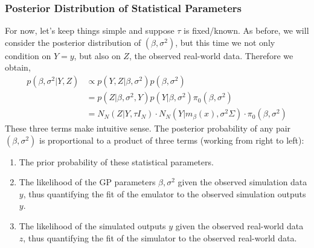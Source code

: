 \documentclass[12pt]{article}
\begin{document}
\subsubsection{Posterior Distribution of Statistical Parameters}
For now, let's keep things simple and suppose $\tau$ is fixed/known. As before, we will 
consider the posterior distribution of $(\beta, \sigma^2)$, but this time we not only condition on $Y = y$, but also on $Z$, the observed real-world data. Therefore we obtain, 
\begin{align*}
p(\beta, \sigma^2|Y, Z) &\propto p(Y, Z|\beta, \sigma^2)p(\beta, \sigma^2) \\
				   &= p(Z|\beta, \sigma^2, Y)p(Y|\beta, \sigma^2)\pi_0(\beta, \sigma^2) \\
				   &= N_N(Z|Y, \tau I_N) \cdot N_N(Y|m_\beta(x), \sigma^2 \Sigma) \cdot \pi_0(\beta, \sigma^2)
\end{align*}
These three terms make intuitive sense. The posterior probability of any pair $(\beta, \sigma^2)$ is proportional to a product of three terms (working from right to left):
\begin{enumerate}
\item The prior probability of these statistical parameters. 
\item The likelihood of the GP parameters $\beta, \sigma^2$ given the observed simulation data $y$, thus quantifying the fit of the emulator to the observed simulation outputs $y$. 
\item The likelihood of the simulated outputs $y$ given the observed real-world data $z$, thus quantifying the fit of the simulator to the observed real-world data. 
\end{enumerate}
\end{document}
